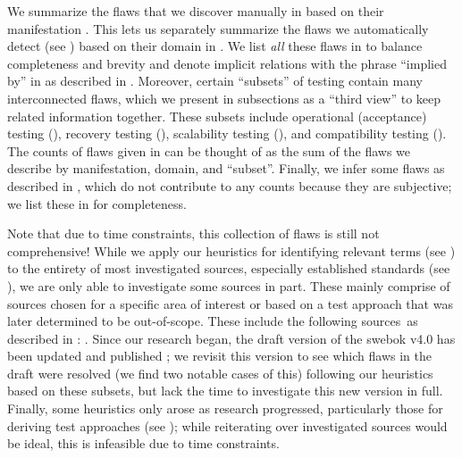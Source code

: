     
    \clearpage
\fi

We summarize the flaws that we discover manually
in  based on their manifestation%
. This lets us separately summarize the flaws we automatically detect
\ifnotpaper (see ) \fi based on their domain %
in .
\ifnotpaper We list \emph{all} these flaws in  to balance
    completeness and brevity and denote implicit relations with the phrase
    ``implied by'' in  as
    described in . \fi Moreover, certain ``subsets'' of
testing contain many interconnected flaws, which we present in subsections as a
``third view'' to keep related information together. These subsets include
\ifnotpaper operational (acceptance) testing (), \fi
recovery testing (), scalability testing (),
and compatibility testing (). The counts of flaws given in
 can be thought of as the sum of the flaws we
describe by manifestation, domain, and ``subset''.  \ifnotpaper Finally, we
    infer some flaws as described in , which do not contribute to
    any counts because they are subjective; we list these in 
    for completeness. \fi

Note that due to time constraints, this collection of flaws is still not
comprehensive! While we apply our heuristics for identifying relevant terms
(see ) to the entirety of most investigated sources,
especially established standards (see ), we are only able to
investigate some sources in part. These mainly comprise of sources chosen for a
specific area of interest or based on a test approach that was later determined
to be out-of-scope. These include the following sources\ifnotpaper\ as described
    in \fi: \citet{ISO2022,ISO2015,Dominguez-PumarEtAl2020,
    PierreEtAl2017,TrudnowskiEtAl2017,YuEtAl2011,Tsui2007,Goralski1999}.%
\label{swebok-update}
Since our research began, the draft version of the \acs{swebok} v4.0
\citep{SWEBOK2024} has been updated and published \citeyearpar{SWEBOK2025};
we revisit this version to see which flaws in the draft were resolved (we find
two notable cases of this) following our heuristics based on these subsets, but
lack the time to investigate this new version in full. Finally, some heuristics
only arose as research progressed, particularly those for deriving test
approaches (see ); %
while reiterating over investigated sources would be ideal, this is infeasible
due to time constraints.

